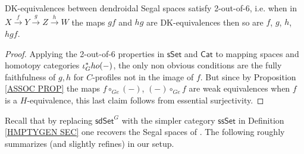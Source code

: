 \documentclass[a4paper,10pt
,draft
]{article}%
\begin{document}


\begin{corollary}\label{26COR}
DK-equivalences between dendroidal Segal spaces satisfy 2-out-of-6, i.e. when in
$X \xrightarrow{f} 
Y \xrightarrow{g}
Z \xrightarrow{h} W$ the maps
$gf$ and $hg$ are DK-equivalences then so are
$f$, $g$, $h$, $hgf$.
\end{corollary}

\begin{proof}
Applying the 2-out-of-6 properties in $\mathsf{sSet}$ and $\mathsf{Cat}$ to mapping spaces and homotopy categories $\iota_G^{\**}ho(-)$,
the only non obvious conditions are the fully faithfulness of $g,h$ for $C$-profiles not in the image of $f$. 
But since by Proposition \ref{ASSOC PROP} the maps
$f \circ_{Ge} (-)$, $(-)\circ_{Ge} f$
are weak equivalences when $f$ is a $H$-equivalence,
this last claim follows from essential surjectivity.
\end{proof}

Recall that by replacing $\mathsf{sdSet}^G$
with the simpler category $\mathsf{ssSet}$ in Definition \ref{HMPTYGEN SEC}
one recovers the Segal spaces of \cite{Rez01}.
The following roughly summarizes (and slightly refines)
\cite[Lemma 5.8, Theorem 6.2, Prop. 11.1, Lemma 11.10]{Rez01} in our setup.
\end{document}
